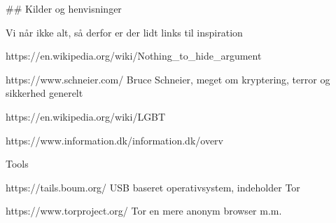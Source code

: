 \documentclass[20pt,landscape,a4paper,footrule]{foils}
\begin{document}
## Kilder og henvisninger

Vi når ikke alt, så derfor er der lidt links til inspiration

https://en.wikipedia.org/wiki/Nothing_to_hide_argument

https://www.schneier.com/ Bruce Schneier, meget om kryptering, terror og sikkerhed generelt

https://en.wikipedia.org/wiki/LGBT

https://www.information.dk/information.dk/overv%

Tools

https://tails.boum.org/ USB baseret operativsystem, indeholder Tor

https://www.torproject.org/ Tor en mere anonym browser m.m.
\end{document}
